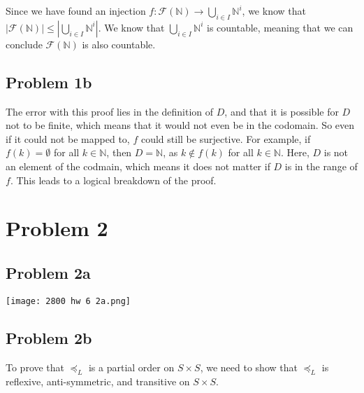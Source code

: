 \documentclass{article}
\begin{document}
Since we have found an injection $f: \mathcal{F}(\mathbb{N}) \rightarrow \bigcup_{i \in I} \mathbb{N}^i$, we know that $|\mathcal{F}(\mathbb{N})| \leq |\bigcup_{i \in I} \mathbb{N}^i|$. We know that $\bigcup_{i \in I} \mathbb{N}^i$ is countable, meaning that we can conclude $\mathcal{F}(\mathbb{N})$ is also countable.

\subsection{Problem 1b}

The error with this proof lies in the definition of $D$, and that it is possible for $D$ not to be finite, which means that it would not even be in the codomain. So even if it could not be mapped to, $f$ could still be surjective. For example, if $f(k) = \emptyset$ for all $k \in \mathbb{N}$, then $D = \mathbb{N}$, as $k \notin f(k)$ for all $k \in \mathbb{N}$. Here, $D$ is not an element of the codmain, which means it does not matter if $D$ is in the range of $f$. This leads to a logical breakdown of the proof.

\section{Problem 2}

\subsection{Problem 2a}

\begin{center}

\texttt{[image: 2800 hw 6 2a.png]}

\end{center}

\subsection{Problem 2b}

To prove that $\preceq_{L}$ is a partial order on $S \times S$, we need to show that $\preceq_{L}$ is reflexive, anti-symmetric, and transitive on $S \times S$.
\end{document}
